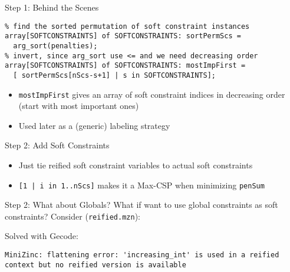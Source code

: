\documentclass[10pt,xcolor={dvipsnames},fleqn]{beamer}
\begin{document}
\begin{frame}[fragile]{Step 1: Behind the Scenes}

\begin{lstlisting}
% find the sorted permutation of soft constraint instances
array[SOFTCONSTRAINTS] of SOFTCONSTRAINTS: sortPermScs = 
  arg_sort(penalties);
% invert, since arg_sort use <= and we need decreasing order
array[SOFTCONSTRAINTS] of SOFTCONSTRAINTS: mostImpFirst = 
  [ sortPermScs[nScs-s+1] | s in SOFTCONSTRAINTS]; 
\end{lstlisting}
\begin{itemize}
\item \texttt{mostImpFirst} gives an array of soft constraint indices in decreasing order (start with most important ones)
\item Used later as a (generic) labeling strategy
\end{itemize}
\end{frame}

\begin{frame}[fragile]{Step 2: Add Soft Constraints}


\begin{itemize}
\item Just tie reified soft constraint variables to actual soft constraints
\item \texttt{[1 | i in 1..nScs]} makes it a Max-CSP when minimizing \texttt{penSum}
\end{itemize}
\end{frame}

\begin{frame}[fragile]{Step 2: What about Globals?}
What if want to use global constraints as soft constraints? 
Consider (\texttt{reified.mzn}):

Solved with Gecode:
\small
\begin{verbatim}
MiniZinc: flattening error: 'increasing_int' is used in a reified 
context but no reified version is available
\end{verbatim}
\end{frame}
\end{document}
